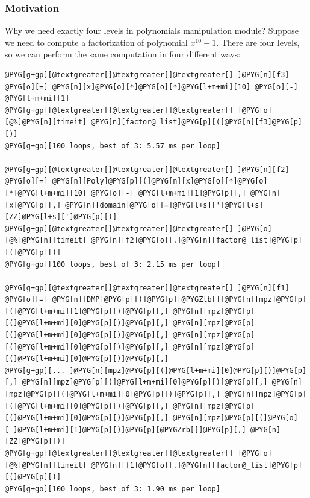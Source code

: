 \subsubsection{Motivation}

Why we need exactly four levels in polynomials manipulation module? Suppose we need to compute
a factorization of polynomial $x^{10} - 1$. There are four levels, so we can perform the same
computation in four different ways:

\begin{Verbatim}[commandchars=@\[\]]
@PYG[g+gp][@textgreater[]@textgreater[]@textgreater[] ]@PYG[n][f3] @PYG[o][=] @PYG[n][x]@PYG[o][*]@PYG[o][*]@PYG[l+m+mi][10] @PYG[o][-] @PYG[l+m+mi][1]
@PYG[g+gp][@textgreater[]@textgreater[]@textgreater[] ]@PYG[o][@%]@PYG[n][timeit] @PYG[n][factor@_list]@PYG[p][(]@PYG[n][f3]@PYG[p][)]
@PYG[g+go][100 loops, best of 3: 5.57 ms per loop]

@PYG[g+gp][@textgreater[]@textgreater[]@textgreater[] ]@PYG[n][f2] @PYG[o][=] @PYG[n][Poly]@PYG[p][(]@PYG[n][x]@PYG[o][*]@PYG[o][*]@PYG[l+m+mi][10] @PYG[o][-] @PYG[l+m+mi][1]@PYG[p][,] @PYG[n][x]@PYG[p][,] @PYG[n][domain]@PYG[o][=]@PYG[l+s][']@PYG[l+s][ZZ]@PYG[l+s][']@PYG[p][)]
@PYG[g+gp][@textgreater[]@textgreater[]@textgreater[] ]@PYG[o][@%]@PYG[n][timeit] @PYG[n][f2]@PYG[o][.]@PYG[n][factor@_list]@PYG[p][(]@PYG[p][)]
@PYG[g+go][100 loops, best of 3: 2.15 ms per loop]

@PYG[g+gp][@textgreater[]@textgreater[]@textgreater[] ]@PYG[n][f1] @PYG[o][=] @PYG[n][DMP]@PYG[p][(]@PYG[p][@PYGZlb[]]@PYG[n][mpz]@PYG[p][(]@PYG[l+m+mi][1]@PYG[p][)]@PYG[p][,] @PYG[n][mpz]@PYG[p][(]@PYG[l+m+mi][0]@PYG[p][)]@PYG[p][,] @PYG[n][mpz]@PYG[p][(]@PYG[l+m+mi][0]@PYG[p][)]@PYG[p][,] @PYG[n][mpz]@PYG[p][(]@PYG[l+m+mi][0]@PYG[p][)]@PYG[p][,] @PYG[n][mpz]@PYG[p][(]@PYG[l+m+mi][0]@PYG[p][)]@PYG[p][,]
@PYG[g+gp][... ]@PYG[n][mpz]@PYG[p][(]@PYG[l+m+mi][0]@PYG[p][)]@PYG[p][,] @PYG[n][mpz]@PYG[p][(]@PYG[l+m+mi][0]@PYG[p][)]@PYG[p][,] @PYG[n][mpz]@PYG[p][(]@PYG[l+m+mi][0]@PYG[p][)]@PYG[p][,] @PYG[n][mpz]@PYG[p][(]@PYG[l+m+mi][0]@PYG[p][)]@PYG[p][,] @PYG[n][mpz]@PYG[p][(]@PYG[l+m+mi][0]@PYG[p][)]@PYG[p][,] @PYG[n][mpz]@PYG[p][(]@PYG[o][-]@PYG[l+m+mi][1]@PYG[p][)]@PYG[p][@PYGZrb[]]@PYG[p][,] @PYG[n][ZZ]@PYG[p][)]
@PYG[g+gp][@textgreater[]@textgreater[]@textgreater[] ]@PYG[o][@%]@PYG[n][timeit] @PYG[n][f1]@PYG[o][.]@PYG[n][factor@_list]@PYG[p][(]@PYG[p][)]
@PYG[g+go][100 loops, best of 3: 1.90 ms per loop]


\end{Verbatim}
